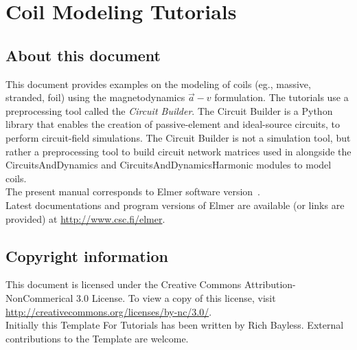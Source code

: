 \chapter*{Coil Modeling Tutorials}

\section*{About this document}

This document provides examples on the modeling of coils (eg., massive, stranded, foil) using the magnetodynamics $\vec a - v$ formulation. The tutorials use a preprocessing tool called the \textit{Circuit Builder}. The Circuit Builder is a Python library that enables the creation of passive-element and ideal-source circuits, to perform circuit-field simulations. The Circuit Builder is not a simulation tool, but rather a preprocessing tool to build circuit  network matrices used in alongside the CircuitsAndDynamics and CircuitsAndDynamicsHarmonic modules to model coils.\\
The present manual corresponds to Elmer software version~\elmerversion{}.\\

Latest documentations and program versions of Elmer are available (or links are provided) at 
\url{http://www.csc.fi/elmer}. 

\section*{Copyright information}

This document is licensed under the Creative Commons Attribution-NonCommerical 3.0 License. 
To view a copy of this license, visit \url{http://creativecommons.org/licenses/by-nc/3.0/}.\\

Initially this Template For Tutorials has been written by Rich Bayless.
External contributions to the Template are welcome.



